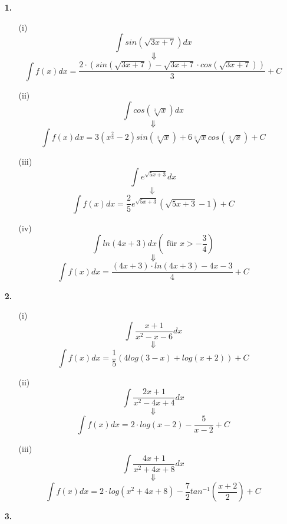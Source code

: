 \documentclass[a4paper,11pt]{article}
\title{\titleinfo}
\author{\authorinfotitle}
\date{\today}
\begin{document}
\maketitle
    \begin{enumerate}
        \item[\textbf{1.}]
         \begin{enumerate}
             \item[(i)]
            $$ \int sin \left( \sqrt{3x+7}\right)dx$$$$ \ \Downarrow $$$$ \int f(x)dx = \frac{2 \cdot (sin (\sqrt{3x+7})-\sqrt{3x+7} \cdot cos(\sqrt{3x+7}))}{3} + C $$
            \item[(ii)]
            $$ \int cos \left( \sqrt[3]{x}\right)dx $$$$ \ \Downarrow \ $$$$  \int f(x)dx = 3\left(x^{\frac{2}{3}}-2\right) sin\left(\sqrt[3]{x}\right) +6\sqrt[3]{x} cos\left(\sqrt[3]{x}\right) + C $$
            \item[(iii)]
            $$ \int e^{\sqrt{5x+3}}dx $$$$ \Downarrow \ $$$$ \int f(x)dx = \frac{2}{5}e^{\sqrt{5x+3}}(\sqrt{5x+3}-1) + C $$
            \item[(iv)]
            $$ \int ln (4x+3)dx \left(\text{ für } x > - \frac{3}{4}\right)  $$$$\ \Downarrow \ $$$$ \int f(x)dx = \frac{(4x+3) \cdot ln(4x+3) -4x -3}{4} + C $$

         \end{enumerate}
              
        \item[\textbf{2.}]
        \begin{enumerate}
            \item[(i)]
             $$\int \frac{x+1}{x^2-x-6}dx $$$$ \Downarrow $$$$  \int f(x)dx = \frac{1}{5}(4log(3-x)+log(x+2)) +C $$
             \item[(ii)]
             $$ \int \frac{2x+1}{x^2-4x+4}dx $$$$ \Downarrow $$$$  \int f(x)dx = 2 \cdot log(x-2) - \frac{5}{x-2} + C $$
             \item[(iii)] 
             $$ \int \frac{4x+1}{x^2+4x+8}dx  $$$$ \Downarrow $$$$  \int f(x)dx = 2 \cdot log(x^2+4x+8) - \frac{7}{2}tan^{-1}\left(\frac{x+2}{2}\right) +C $$
 
        \end{enumerate}



        \item[\textbf{3.}]
         

\end{enumerate}
\end{document}
